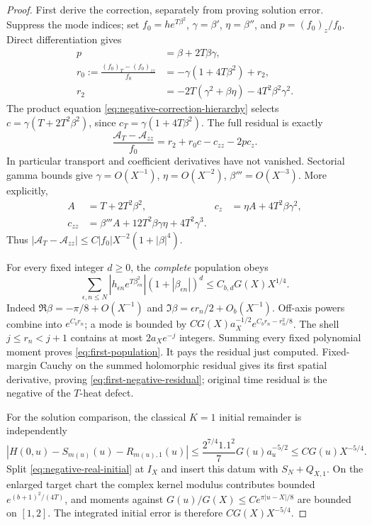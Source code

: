 \documentclass[11pt]{article}
\numberwithin{equation}{section}
\begin{document}
\begin{proof}
First derive the correction, separately from proving solution error.
Suppress the mode indices; set \(f_0=he^{T\beta^2}\),
\(\gamma=\beta'\), \(\eta=\beta''\), and \(p=(f_0)_z/f_0\).
Direct differentiation gives
\begin{align}
 p&=\beta+2T\beta\gamma,\\
 r_0:=\frac{(f_0)_T-(f_0)_{zz}}{f_0}
   &=-\gamma(1+4T\beta^2)+r_2,\\
 r_2&=-2T(\gamma^2+\beta\eta)-4T^2\beta^2\gamma^2.
 \label{eq:first-product-data}
\end{align}
The product equation \eqref{eq:negative-correction-hierarchy} selects
\(c=\gamma(T+2T^2\beta^2)\), since
\(c_T=\gamma(1+4T\beta^2)\). The full residual is exactly
\begin{equation}
 \frac{\mathcal A_T-\mathcal A_{zz}}{f_0}
       =r_2+r_0c-c_{zz}-2pc_z.
 \label{eq:first-exact-residual}
\end{equation}
In particular transport and coefficient derivatives have not vanished.
Sectorial gamma bounds give
\(\gamma=O(X^{-1})\), \(\eta=O(X^{-2})\),
\(\beta'''=O(X^{-3})\). More explicitly,
\[
 \begin{aligned}
 A&=T+2T^2\beta^2,&c_z&=\eta A+4T^2\beta\gamma^2,\\
 c_{zz}&=\beta'''A+12T^2\beta\gamma\eta+4T^2\gamma^3.
 \end{aligned}
\]
Thus \(|\mathcal A_T-\mathcal A_{zz}|
\le C|f_0|X^{-2}(1+|\beta|^4)\).

For every fixed integer \(d\ge0\), the \emph{complete} population obeys
\begin{equation}
 \sum_{\epsilon,n\le N}|h_{\epsilon n}e^{T\beta_{\epsilon n}^2}|
       (1+|\beta_{\epsilon n}|)^d
       \le C_{b,d}G(X)X^{1/4}.
 \label{eq:first-population}
\end{equation}
Indeed \(\Re\beta=-\pi/8+O(X^{-1})\) and
\(\Im\beta=\epsilon r_n/2+O_b(X^{-1})\).
Off-axis powers combine into \(e^{C_b r_n}\); a mode is bounded by
\(CG(X)a_X^{-1/2}e^{C_b r_n-r_n^2/8}\).
The shell \(j\le r_n<j+1\) contains at most \(2a_Xe^{-j}\)
integers. Summing every fixed polynomial moment proves
\eqref{eq:first-population}. It pays the residual just computed.
Fixed-margin Cauchy on the summed holomorphic residual gives its first
spatial derivative, proving \eqref{eq:first-negative-residual}; original
time residual is the negative of the \(T\)-heat defect.

For the solution comparison, the classical \(K=1\) initial remainder
is independently
\begin{equation}
 |H(0,u)-S_{m(u)}(u)-R_{m(u),1}(u)|
 \le \frac{2^{7/4}1.1^2}{7}G(u)a_u^{-5/2}
 \le CG(u)X^{-5/4}.
 \label{eq:first-initial-remainder}
\end{equation}
Split \eqref{eq:negative-real-initial} at \(I_X\) and insert this
datum with \(S_N+Q_{X,1}\). On the enlarged target chart the complex
kernel modulus contributes bounded \(e^{(b+1)^2/(4T)}\), and moments
against \(G(u)/G(X)\le Ce^{\pi|u-X|/8}\) are bounded on
\([1,2]\). The integrated initial error is therefore
\(CG(X)X^{-5/4}\).


\end{proof}
\end{document}
